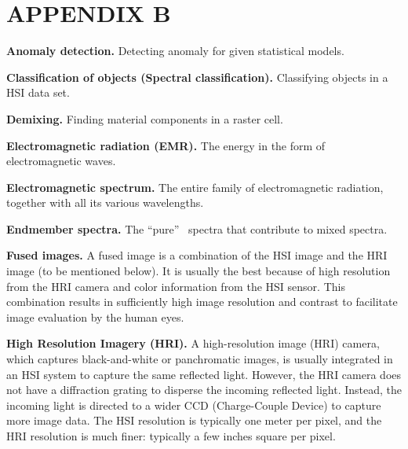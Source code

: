 %

\chapter{APPENDIX B}
\label{cha:app2}


\indent \textbf{Anomaly detection.} Detecting anomaly for given statistical models.

\textbf{Classification of objects (Spectral classification).} Classifying
objects in a HSI data set.

\textbf{Demixing.} Finding material components in a raster cell.

\textbf{Electromagnetic radiation (EMR).} The energy in the form of
electromagnetic waves.

\textbf{Electromagnetic spectrum.} The entire family of electromagnetic
radiation, together with all its various wavelengths.

\textbf{Endmember spectra.} The \textquotedblleft pure\textquotedblright%
\ spectra that contribute to mixed spectra.

\textbf{Fused images.} A fused image is a combination of the HSI image and the
HRI image (to be mentioned below). It is usually the best because of high
resolution from the HRI camera and color information from the HSI sensor. This
combination results in sufficiently high image resolution and contrast to
facilitate image evaluation by the human eyes.

\textbf{High Resolution Imagery (HRI).} A high-resolution image (HRI) camera,
which captures black-and-white or panchromatic images, is usually integrated
in an HSI system to capture the same reflected light. However, the HRI camera
does not have a diffraction grating to disperse the incoming reflected light.
Instead, the incoming light is directed to a wider CCD (Charge-Couple Device) to capture more image
data. The HSI resolution is typically one meter per pixel, and the HRI
resolution is much finer: typically a few inches square per pixel.

